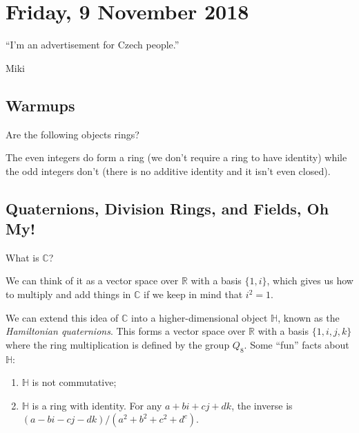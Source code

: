 \section{Friday, 9 November 2018}

\epigraph{``I'm an advertisement for Czech people.''}{Miki}

\subsection{Warmups}

\begin{exercise}
Are the following objects rings?
\end{exercise}

\begin{solution}
The even integers do form a ring (we don't require a ring to have identity) while the odd integers don't (there is no additive identity and it isn't even closed).
\end{solution}

\subsection{Quaternions, Division Rings, and Fields, Oh My!}

\begin{exercise}
What is $\mathbb{C}$?
\end{exercise}

\begin{solution}
We can think of it as a vector space over $\mathbb{R}$ with a basis $\{1,i\}$, which gives us how to multiply and add things in $\mathbb{C}$ if we keep in mind that $i^2 = 1$.
\end{solution}

We can extend this idea of $\mathbb{C}$ into a higher-dimensional object $\mathbb{H}$, known as the \emph{Hamiltonian quaternions}. This forms a vector space over $\mathbb{R}$ with a basis $\{1,i,j,k\}$ where the ring multiplication is defined by the group $Q_8$. Some ``fun'' facts about $\mathbb{H}$:
\begin{enumerate}
\item $\mathbb{H}$ is not commutative;
\item $\mathbb{H}$ is a ring with identity. For any $a + bi + cj + dk$, the inverse is $(a - bi - cj - dk)/(a^2+b^2+c^2+d^c)$.
\end{enumerate}

